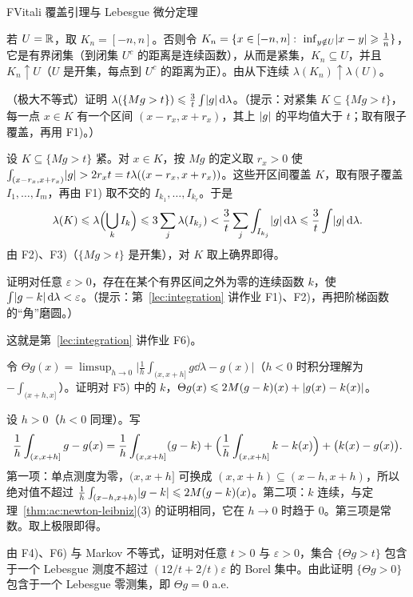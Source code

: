 \begin{probleme}{F}{Vitali 覆盖引理与 Lebesgue 微分定理}
\begin{questions}
\begin{solution}
若 $U=\mathbb{R}$，取 $K_n=[-n,n]$。否则令 $K_n=\{x\in[-n,n]:\ \inf_{y\notin U}\lvert x-y\rvert\geqslant\frac1n\}$，它是有界闭集（到闭集 $U^c$ 的距离是连续函数），从而是紧集，$K_n\subseteq U$，并且 $K_n\uparrow U$（$U$ 是开集，每点到 $U^c$ 的距离为正）。由从下连续 $\lambda(K_n)\uparrow\lambda(U)$。
\end{solution}
\item （极大不等式）证明 $\lambda(\{Mg>t\})\leqslant\frac3t\int\lvert g\rvert\,\mathrm{d}\lambda$。（提示：对紧集 $K\subseteq\{Mg>t\}$，每一点 $x\in K$ 有一个区间 $(x-r_x,x+r_x)$，其上 $\lvert g\rvert$ 的平均值大于 $t$；取有限子覆盖，再用 F1)。）
\begin{solution}
设 $K\subseteq\{Mg>t\}$ 紧。对 $x\in K$，按 $Mg$ 的定义取 $r_x>0$ 使 $\int_{(x-r_x,x+r_x)}\lvert g\rvert>2r_xt=t\lambda((x-r_x,x+r_x))$。这些开区间覆盖 $K$，取有限子覆盖 $I_1,\dots,I_m$，再由 F1) 取不交的 $I_{k_1},\dots,I_{k_r}$。于是
\[
\lambda(K)\leqslant\lambda\Bigl(\bigcup_kI_k\Bigr)\leqslant3\sum_j\lambda(I_{k_j})<\frac3t\sum_j\int_{I_{k_j}}\lvert g\rvert\,\mathrm{d}\lambda\leqslant\frac3t\int\lvert g\rvert\,\mathrm{d}\lambda .
\]
由 F2)、F3)（$\{Mg>t\}$ 是开集），对 $K$ 取上确界即得。
\end{solution}
\item 证明对任意 $\varepsilon>0$，存在在某个有界区间之外为零的连续函数 $k$，使 $\int\lvert g-k\rvert\,\mathrm{d}\lambda<\varepsilon$。（提示：第~\ref{lec:integration} 讲作业 F1)、F2)，再把阶梯函数的“角”磨圆。）
\begin{solution}
这就是第~\ref{lec:integration} 讲作业 F6)。
\end{solution}
\item 令 $\Theta g(x)=\limsup_{h\to0}\bigl|\frac1h\int_{(x,x+h]}g\dd\lambda-g(x)\bigr|$（$h<0$ 时积分理解为 $-\int_{(x+h,x]}$）。证明对 F5) 中的 $k$，$\Theta g(x)\leqslant2M(g-k)(x)+\lvert g(x)-k(x)\rvert$。
\begin{solution}
设 $h>0$（$h<0$ 同理）。写
\[
\frac1h\int_{(x,x+h]}g-g(x)=\frac1h\int_{(x,x+h]}(g-k)+\Bigl(\frac1h\int_{(x,x+h]}k-k(x)\Bigr)+\bigl(k(x)-g(x)\bigr).
\]
第一项：单点测度为零，$(x,x+h]$ 可换成 $(x,x+h)\subseteq(x-h,x+h)$，所以绝对值不超过 $\frac1h\int_{(x-h,x+h)}\lvert g-k\rvert\leqslant2M(g-k)(x)$。第二项：$k$ 连续，与定理~\ref{thm:ac:newton-leibniz}(3) 的证明相同，它在 $h\to0$ 时趋于 $0$。第三项是常数。取上极限即得。
\end{solution}
\item 由 F4)、F6) 与 Markov 不等式，证明对任意 $t>0$ 与 $\varepsilon>0$，集合 $\{\Theta g>t\}$ 包含于一个 Lebesgue 测度不超过 $(12/t+2/t)\varepsilon$ 的 Borel 集中。由此证明 $\{\Theta g>0\}$ 包含于一个 Lebesgue 零测集，即 $\Theta g=0$ a.e.

\end{questions}
\end{probleme}
